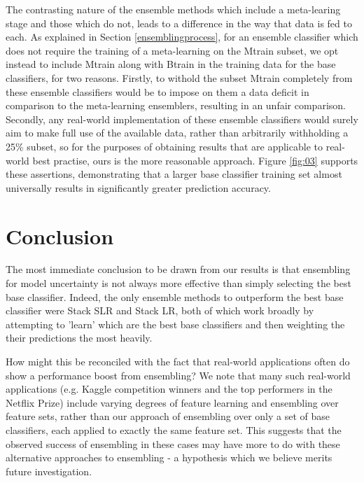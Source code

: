 \documentclass{document}
\begin{document}
\noindent
The contrasting nature of the ensemble methods which include a meta-learing stage and those which do not, leads to a difference in the way that data is fed to each. As explained in Section \ref{ensemblingprocess}, for an ensemble classifier which does not require the training of a meta-learning on the Mtrain subset, we opt instead to include Mtrain along with Btrain in the training data for the base classifiers, for two reasons. Firstly, to withold the subset Mtrain completely from these ensemble classifiers would be to impose on them a data deficit in comparison to the meta-learning ensemblers, resulting in an unfair comparison. Secondly, any real-world implementation of these ensemble classifiers would surely aim to make full use of the available data, rather than arbitrarily withholding a 25\% subset, so for the purposes of obtaining results that are applicable to real-world best practise, ours is the more reasonable approach. Figure \ref{fig:03} supports these assertions, demonstrating that a larger base classifier training set almost universally results in significantly greater prediction accuracy.


\vspace{-5mm}
\section{Conclusion}

The most immediate conclusion to be drawn from our results is that ensembling for model uncertainty is not always more effective than simply selecting the best base classifier. Indeed, the only ensemble methods to outperform the best base classifier were Stack SLR and Stack LR, both of which work broadly by attempting to 'learn' which are the best base classifiers and then weighting the their predictions the most heavily.

How might this be reconciled with the fact that real-world applications often do show a performance boost from ensembling? We note that many such real-world applications (e.g. Kaggle competition winners and the top performers in the Netflix Prize) include varying degrees of feature learning and ensembling over feature sets, rather than our approach of ensembling over only a set of base classifiers, each applied to exactly the same feature set. This suggests that the observed success of ensembling in these cases may have more to do with these alternative approaches to ensembling - a hypothesis which we believe merits future investigation.
\end{document}

